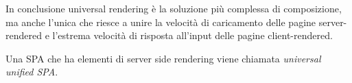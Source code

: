 In conclusione universal rendering è la soluzione più complessa di composizione, ma anche l'unica che riesce a unire la velocità di caricamento delle pagine server-rendered
e l'estrema velocità di risposta all'input delle pagine client-rendered.

Una SPA che ha elementi di server side rendering viene chiamata \emph{universal unified SPA}.

